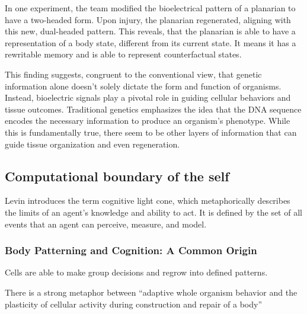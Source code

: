 In one experiment, the team modified the bioelectrical pattern of a planarian to have a two-headed form. Upon injury, the planarian regenerated, aligning with this new, dual-headed pattern. This reveals, that the planarian is able to have a representation of a body state, different from its current state. It means it has a rewritable memory and is able to represent \gls{counterfactual states}.

This finding suggests, congruent to the conventional view, that genetic information alone doesn't solely dictate the form and function of organisms. Instead, bioelectric signals play a pivotal role in guiding cellular behaviors and tissue outcomes. Traditional genetics emphasizes the idea that the DNA sequence encodes the necessary information to produce an organism's phenotype. While this is fundamentally true, there seem to be other layers of information that can guide tissue organization and even regeneration.




\subsection{Computational boundary of the self}
Levin introduces the term \gls{cognitive light cone}, which metaphorically describes the limits of an agent's knowledge and ability to act. It is defined by the set of all events that an agent can perceive, measure, and model. 

\subsubsection{Body Patterning and Cognition: A Common Origin}

Cells are able to make group decisions and regrow into defined patterns.

There is a strong metaphor between “adaptive whole organism behavior and the plasticity of cellular activity during construction and repair of a body”

